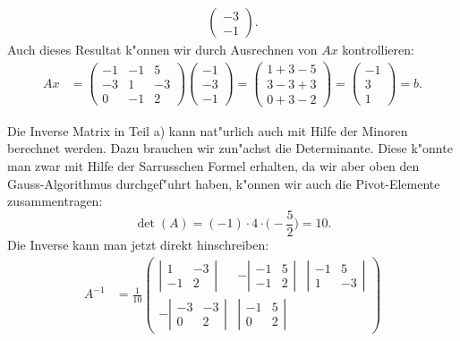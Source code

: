 \begin{loesung}
\begin{teilaufgaben}
\begin{align*}
\begin{pmatrix}
-3\\
-1
\end{pmatrix}.
\end{align*}
Auch dieses Resultat k"onnen wir durch Ausrechnen von $Ax$ kontrollieren:
\begin{align*}
Ax
&=
\begin{pmatrix}
  -1& -1&  5\\
  -3&  1& -3\\
   0& -1&  2
\end{pmatrix}
\begin{pmatrix}
-1\\-3\\-1
\end{pmatrix}
=
\begin{pmatrix}
1+3-5\\
3-3+3\\
0+3-2
\end{pmatrix}
=
\begin{pmatrix}
-1\\3\\1
\end{pmatrix}
=b.
\end{align*}
\end{teilaufgaben}
Die Inverse Matrix in Teil a) kann nat"urlich auch mit Hilfe der
Minoren berechnet werden.
Dazu brauchen wir zun"achst die Determinante. Diese k"onnte man zwar mit
Hilfe der Sarrusschen Formel erhalten, da wir aber oben den Gauss-Algorithmus
durchgef"uhrt haben, k"onnen wir auch die Pivot-Elemente zusammentragen:
\[
\det(A)
=
(-1)\cdot 4\cdot \biggl(-\frac52\biggr)
=
10.
\]
Die Inverse kann man jetzt direkt hinschreiben:
\begin{align*}
A^{-1}
&=
\frac1{10}
\begin{pmatrix}
\left|\begin{matrix} 1&-3\\-1& 2\end{matrix}\right|&
-\left|\begin{matrix}-1& 5\\-1& 2\end{matrix}\right|&
\left|\begin{matrix}-1& 5\\ 1&-3\end{matrix}\right|\\
-\left|\begin{matrix}-3&-3\\ 0& 2\end{matrix}\right|&
\left|\begin{matrix}-1& 5\\ 0& 2\end{matrix}\right|&

\end{pmatrix}
\end{align*}
\end{loesung}

